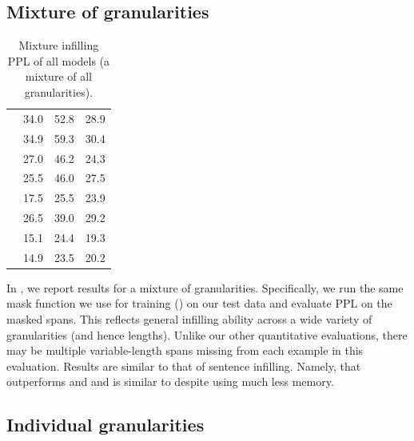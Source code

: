 \subsection{Mixture of granularities}

\begin{table}[t]
    \centering
    \begin{tabular}[t]{lccc}
        \toprule
            & \sto{}   & \abs{}   & \lyr{} \\
        \midrule
\lmscratch{} & 34.0 & 52.8 & 28.9 \\
\lmrevscratch{} & 34.9 & 59.3 & 30.4 \\
\lmallscratch{} & 27.0 & 46.2 & 24.3 \\
\ilmscratch{} & 25.5 & 46.0 & 27.5 \\
\lm{} & 17.5 & 25.5 & 23.9 \\
\lmrev{} & 26.5 & 39.0 & 29.2 \\
\lmall{} & 15.1 & 24.4 & 19.3 \\
\ilm{} & 14.9 & 23.5 & 20.2 \\
        \bottomrule
    \end{tabular}
    \caption{Mixture infilling PPL of all models (a mixture of all granularities).}
    \label{tab:granu_ppl_all}
\end{table}

In , we report results for a mixture of granularities. 
Specifically, we run the same mask function we use for training () on our test data and evaluate PPL on the masked spans.
This reflects general infilling ability across a wide variety of granularities (and hence lengths). 
Unlike our other quantitative evaluations, there may be multiple variable-length spans missing from each example in this evaluation.
Results are similar to that of sentence infilling. 
Namely, that \ilm{} outperforms \lm{} and \lmrev{} and is similar to \lmall{} despite using much less memory.

\subsection{Individual granularities}

